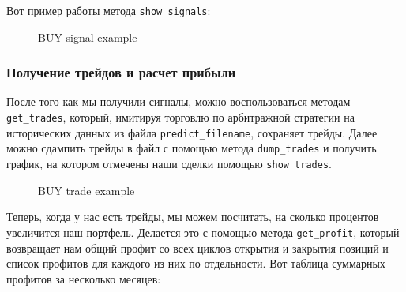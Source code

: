 Вот пример работы метода \texttt{show\_signals}:
\begin{figure}[H]
\caption{BUY signal example}
\label{fig:image}
\end{figure}

\subsubsection{Получение трейдов и расчет прибыли}
После того как мы получили сигналы, можно воспользоваться методам \texttt{get\_trades}, который, имитируя торговлю по арбитражной стратегии на исторических данных из файла  \texttt{predict\_filename}, сохраняет трейды. Далее можно сдампить трейды в файл с помощью метода \texttt{dump\_trades} и получить график, на котором отмечены наши сделки  помощью \texttt{show\_trades}. 
\begin{figure}[H]
\caption{BUY trade example}
\label{fig:image}
\end{figure}


Теперь, когда у нас есть трейды, мы можем посчитать, на сколько процентов увеличится наш портфель. Делается это с помощью метода \texttt{get\_profit}, который возвращает нам общий профит со всех циклов открытия и закрытия позиций и список профитов для каждого из них по отдельности. Вот таблица суммарных профитов за несколько месяцев:

